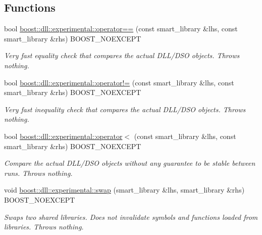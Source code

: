 \subsection*{Functions}
\begin{DoxyCompactItemize}
\item 
\mbox{\label{a00275_a28f2c872bb195c01abac14c422574200}} 
bool \hyperlink{a00275_a28f2c872bb195c01abac14c422574200}{boost\+::dll\+::experimental\+::operator==} (const smart\+\_\+library \&lhs, const smart\+\_\+library \&rhs) B\+O\+O\+S\+T\+\_\+\+N\+O\+E\+X\+C\+E\+PT
\begin{DoxyCompactList}\small\item\em Very fast equality check that compares the actual D\+L\+L/\+D\+SO objects. Throws nothing. \end{DoxyCompactList}\item 
\mbox{\label{a00275_ae0e073cbea11e17ecd11379d09932d5a}} 
bool \hyperlink{a00275_ae0e073cbea11e17ecd11379d09932d5a}{boost\+::dll\+::experimental\+::operator!=} (const smart\+\_\+library \&lhs, const smart\+\_\+library \&rhs) B\+O\+O\+S\+T\+\_\+\+N\+O\+E\+X\+C\+E\+PT
\begin{DoxyCompactList}\small\item\em Very fast inequality check that compares the actual D\+L\+L/\+D\+SO objects. Throws nothing. \end{DoxyCompactList}\item 
\mbox{\label{a00275_a40d1a66c634ab4786294da1d4a72a742}} 
bool \hyperlink{a00275_a40d1a66c634ab4786294da1d4a72a742}{boost\+::dll\+::experimental\+::operator$<$} (const smart\+\_\+library \&lhs, const smart\+\_\+library \&rhs) B\+O\+O\+S\+T\+\_\+\+N\+O\+E\+X\+C\+E\+PT
\begin{DoxyCompactList}\small\item\em Compare the actual D\+L\+L/\+D\+SO objects without any guarantee to be stable between runs. Throws nothing. \end{DoxyCompactList}\item 
\mbox{\label{a00275_ae367de5e0fec67022b59687adcd0c065}} 
void \hyperlink{a00275_ae367de5e0fec67022b59687adcd0c065}{boost\+::dll\+::experimental\+::swap} (smart\+\_\+library \&lhs, smart\+\_\+library \&rhs) B\+O\+O\+S\+T\+\_\+\+N\+O\+E\+X\+C\+E\+PT
\begin{DoxyCompactList}\small\item\em Swaps two shared libraries. Does not invalidate symbols and functions loaded from libraries. Throws nothing. \end{DoxyCompactList}\item 

\end{DoxyCompactItemize}

